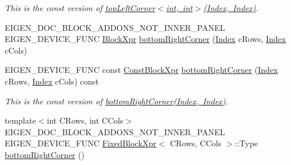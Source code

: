 \begin{DoxyCompactItemize}
\begin{DoxyCompactList}\small\item\em This is the const version of \mbox{\hyperlink{class_eigen_1_1_sparse_matrix_base_a5e0cd43cb4555c7ef79fd0481d117cce}{top\+Left\+Corner$<$int, int$>$(\+Index, Index)}}. \end{DoxyCompactList}\item 
E\+I\+G\+E\+N\+\_\+\+D\+O\+C\+\_\+\+B\+L\+O\+C\+K\+\_\+\+A\+D\+D\+O\+N\+S\+\_\+\+N\+O\+T\+\_\+\+I\+N\+N\+E\+R\+\_\+\+P\+A\+N\+EL E\+I\+G\+E\+N\+\_\+\+D\+E\+V\+I\+C\+E\+\_\+\+F\+U\+NC \mbox{\hyperlink{class_eigen_1_1_block}{Block\+Xpr}} \mbox{\hyperlink{class_eigen_1_1_sparse_matrix_base_aa531aefed8ea1fa530c638abc8eea6c9}{bottom\+Right\+Corner}} (\mbox{\hyperlink{struct_eigen_1_1_eigen_base_a554f30542cc2316add4b1ea0a492ff02}{Index}} c\+Rows, \mbox{\hyperlink{struct_eigen_1_1_eigen_base_a554f30542cc2316add4b1ea0a492ff02}{Index}} c\+Cols)
\item 
\mbox{\label{class_eigen_1_1_sparse_matrix_base_ac66a3a6035f4b89a9e85c0bcaf8a4364}} 
E\+I\+G\+E\+N\+\_\+\+D\+E\+V\+I\+C\+E\+\_\+\+F\+U\+NC const \mbox{\hyperlink{class_eigen_1_1_block}{Const\+Block\+Xpr}} \mbox{\hyperlink{class_eigen_1_1_sparse_matrix_base_ac66a3a6035f4b89a9e85c0bcaf8a4364}{bottom\+Right\+Corner}} (\mbox{\hyperlink{struct_eigen_1_1_eigen_base_a554f30542cc2316add4b1ea0a492ff02}{Index}} c\+Rows, \mbox{\hyperlink{struct_eigen_1_1_eigen_base_a554f30542cc2316add4b1ea0a492ff02}{Index}} c\+Cols) const
\begin{DoxyCompactList}\small\item\em This is the const version of \mbox{\hyperlink{class_eigen_1_1_sparse_matrix_base_aa531aefed8ea1fa530c638abc8eea6c9}{bottom\+Right\+Corner(\+Index, Index)}}. \end{DoxyCompactList}\item 
{\footnotesize template$<$int C\+Rows, int C\+Cols$>$ }\\E\+I\+G\+E\+N\+\_\+\+D\+O\+C\+\_\+\+B\+L\+O\+C\+K\+\_\+\+A\+D\+D\+O\+N\+S\+\_\+\+N\+O\+T\+\_\+\+I\+N\+N\+E\+R\+\_\+\+P\+A\+N\+EL E\+I\+G\+E\+N\+\_\+\+D\+E\+V\+I\+C\+E\+\_\+\+F\+U\+NC \mbox{\hyperlink{struct_eigen_1_1_sparse_matrix_base_1_1_fixed_block_xpr}{Fixed\+Block\+Xpr}}$<$ C\+Rows, C\+Cols $>$\+::Type \mbox{\hyperlink{class_eigen_1_1_sparse_matrix_base_a3f810c062c1bc3cad4ae82be15c15636}{bottom\+Right\+Corner}} ()
\item 
\mbox{\label{class_eigen_1_1_sparse_matrix_base_ad511aa3f5b977089238bf0903f8f2267}} 

\end{DoxyCompactItemize}
